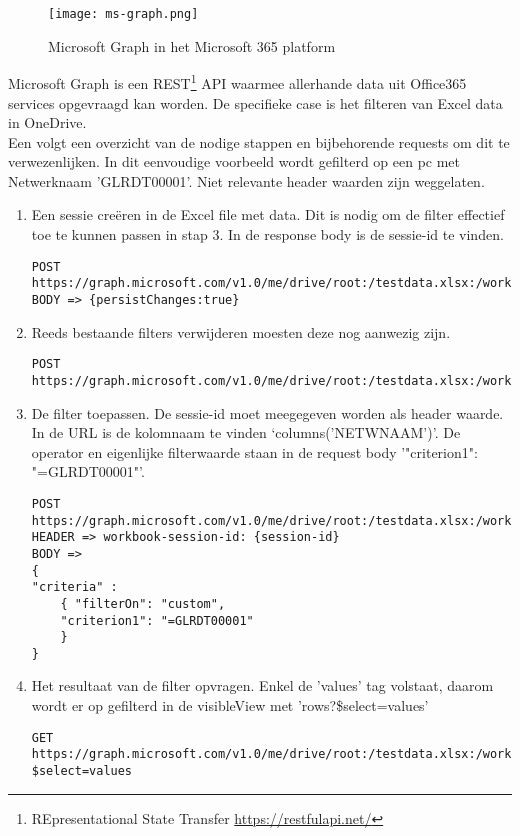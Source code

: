 \begin{figure}[h!]
    \texttt{[image: ms-graph.png]}
    \caption{Microsoft Graph in het Microsoft 365 platform \autocite{MicrosoftDocs2020d}}
    \label{fig:ms-graph}
\end{figure}


Microsoft Graph is een REST\footnote{REpresentational State Transfer \url{https://restfulapi.net/}} API waarmee allerhande data uit Office365 services opgevraagd kan worden. De specifieke case is het filteren van Excel data in OneDrive.\\
Een volgt een overzicht van de nodige stappen en bijbehorende requests om dit te verwezenlijken.
In dit eenvoudige voorbeeld wordt gefilterd op een pc met Netwerknaam 'GLRDT00001'. Niet relevante header waarden zijn weggelaten.
\begin{enumerate}
    \item Een sessie creëren in de Excel file met data. Dit is nodig om de filter effectief toe te kunnen passen in stap 3. In de response body is de sessie-id te vinden.
\begin{lstlisting}
POST https://graph.microsoft.com/v1.0/me/drive/root:/testdata.xlsx:/workbook/createsession
BODY => {persistChanges:true}
\end{lstlisting}
    \item Reeds bestaande filters verwijderen moesten deze nog aanwezig zijn.
\begin{lstlisting}
POST https://graph.microsoft.com/v1.0/me/drive/root:/testdata.xlsx:/workbook/worksheets('Blad1')/tables('tabel1')/clearFilters
\end{lstlisting}
    \item De filter toepassen. De sessie-id moet meegegeven worden als header waarde. In de URL is de kolomnaam te vinden `columns('NETWNAAM')'. De operator en eigenlijke filterwaarde staan in de request body '"criterion1": "=GLRDT00001"'.
\begin{lstlisting}
POST https://graph.microsoft.com/v1.0/me/drive/root:/testdata.xlsx:/workbook/worksheets('Blad1')/tables('tabel1')/columns('NETWNAAM')/filter/apply
HEADER => workbook-session-id: {session-id}
BODY => 
{
"criteria" : 
    { "filterOn": "custom",
    "criterion1": "=GLRDT00001"
    }
}
\end{lstlisting}
    \item Het resultaat van de filter opvragen. Enkel de 'values' tag volstaat, daarom wordt er op gefilterd in de visibleView met 'rows?\$select=values'
\begin{lstlisting}
GET https://graph.microsoft.com/v1.0/me/drive/root:/testdata.xlsx:/workbook/worksheets('Blad1')/tables('tabel1')/range/visibleView/rows?$select=values
\end{lstlisting}
\end{enumerate}


